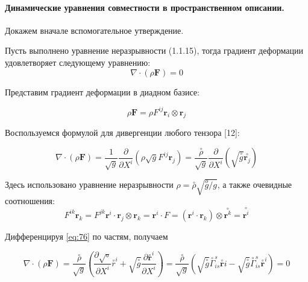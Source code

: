  
\paragraph{Динамические уравнения совместности в пространственном описании.}
Докажем вначале вспомогательное утверждение.
\begin{theorem}
Пусть выполнено уравнение неразрывности (1.1.15), тогда градиент деформации удовлетворяет следующему уравнению:
\begin{equation}
\label{eq:75}
\nabla \cdot(\rho \mathbf{F})=0 
\end{equation}
\end{theorem}

 Представим градиент деформации в диадном базисе:

\begin{equation}
\label{eq:76}
\rho \mathbf{F}=\rho F^{i j} \mathbf{r}_{i} \otimes \mathbf{r}_{j} 
\end{equation}

Воспользуемся формулой для дивергенции любого тензора [12]:

\begin{equation}
\label{eq:77}
\nabla \cdot (\rho \mathbf{F}) = 
\frac{1}{\sqrt{g}}
\frac{\partial}{\partial X^i}
(\rho \sqrt{g} F^{i j} \mathbf{r}_{j} ) = 
\frac{\stackrel{\circ}{\rho}}{\sqrt{g}}
\frac{\partial}{\partial X^i}
( \sqrt{\stackrel{\circ} g} \stackrel{\circ} {\mathbf{r}_{j} }) 
\end{equation}

Здесь использовано уравнение неразрывности $\rho=\stackrel{\circ}{\rho} \sqrt{\stackrel{o}{g} / g}$, а также очевидные соотношения:
\begin{equation}
\label{eq:78}
F^{ik}\textbf{r}_k =
F^{jk}\textbf{r}^i \cdot\textbf{r}_j \otimes \textbf{r}_k 
=\textbf{r}^i \cdot F
=(\textbf{r}^i \cdot\textbf{r}_k)\otimes \stackrel{\circ} {\textbf{r}^k} =\stackrel{\circ} {\textbf{r}^i}
\end{equation}


Дифференцируя \eqref{eq:76} по частям, получаем

\begin{equation}
\label{eq:79}
\nabla \cdot(\rho \mathbf{F})
=\frac{\stackrel{\circ}{\rho}}{\sqrt{g}}\left(\frac{\partial \sqrt{\circ}}{\partial X^{i}} \stackrel{\circ}{r}^{i}+\sqrt{\stackrel{\circ}{g}} \frac{\partial \stackrel{\circ}{\mathbf{r}}^{i}}{\partial X^{i}}\right)
=\frac{\stackrel{\circ}{\rho}}{\sqrt{g}}\left(\sqrt{\stackrel{\circ}{g}} \stackrel{\circ}{\Gamma}_{i s}^{s} \stackrel{\circ}{\mathbf{r}} \stackrel{ }{i}-\sqrt{\stackrel{\circ}{g}} \stackrel{\circ}{\Gamma}_{i s}^{s} \stackrel{\circ}{\mathbf{r}}^{i}\right)
=0 
\end{equation}

